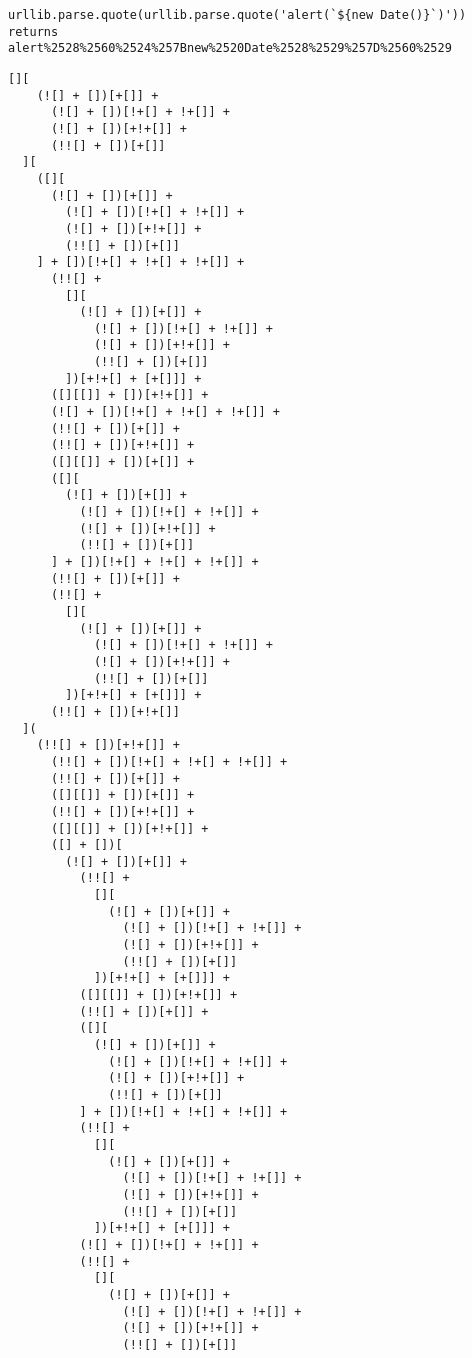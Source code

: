 \begin{lstlisting}[style=basicStyle, caption=url encoded example pass, label={lst:doublepercentencoding}]
urllib.parse.quote(urllib.parse.quote('alert(`${new Date()}`)'))
returns
alert%2528%2560%2524%257Bnew%2520Date%2528%2529%257D%2560%2529
\end{lstlisting}

\begin{lstlisting}[style=basicStyle, caption=alert('XSS') in JSFuck, label={lst:alertxssjsfuck}]
  [][
    (![] + [])[+[]] +
      (![] + [])[!+[] + !+[]] +
      (![] + [])[+!+[]] +
      (!![] + [])[+[]]
  ][
    ([][
      (![] + [])[+[]] +
        (![] + [])[!+[] + !+[]] +
        (![] + [])[+!+[]] +
        (!![] + [])[+[]]
    ] + [])[!+[] + !+[] + !+[]] +
      (!![] +
        [][
          (![] + [])[+[]] +
            (![] + [])[!+[] + !+[]] +
            (![] + [])[+!+[]] +
            (!![] + [])[+[]]
        ])[+!+[] + [+[]]] +
      ([][[]] + [])[+!+[]] +
      (![] + [])[!+[] + !+[] + !+[]] +
      (!![] + [])[+[]] +
      (!![] + [])[+!+[]] +
      ([][[]] + [])[+[]] +
      ([][
        (![] + [])[+[]] +
          (![] + [])[!+[] + !+[]] +
          (![] + [])[+!+[]] +
          (!![] + [])[+[]]
      ] + [])[!+[] + !+[] + !+[]] +
      (!![] + [])[+[]] +
      (!![] +
        [][
          (![] + [])[+[]] +
            (![] + [])[!+[] + !+[]] +
            (![] + [])[+!+[]] +
            (!![] + [])[+[]]
        ])[+!+[] + [+[]]] +
      (!![] + [])[+!+[]]
  ](
    (!![] + [])[+!+[]] +
      (!![] + [])[!+[] + !+[] + !+[]] +
      (!![] + [])[+[]] +
      ([][[]] + [])[+[]] +
      (!![] + [])[+!+[]] +
      ([][[]] + [])[+!+[]] +
      ([] + [])[
        (![] + [])[+[]] +
          (!![] +
            [][
              (![] + [])[+[]] +
                (![] + [])[!+[] + !+[]] +
                (![] + [])[+!+[]] +
                (!![] + [])[+[]]
            ])[+!+[] + [+[]]] +
          ([][[]] + [])[+!+[]] +
          (!![] + [])[+[]] +
          ([][
            (![] + [])[+[]] +
              (![] + [])[!+[] + !+[]] +
              (![] + [])[+!+[]] +
              (!![] + [])[+[]]
          ] + [])[!+[] + !+[] + !+[]] +
          (!![] +
            [][
              (![] + [])[+[]] +
                (![] + [])[!+[] + !+[]] +
                (![] + [])[+!+[]] +
                (!![] + [])[+[]]
            ])[+!+[] + [+[]]] +
          (![] + [])[!+[] + !+[]] +
          (!![] +
            [][
              (![] + [])[+[]] +
                (![] + [])[!+[] + !+[]] +
                (![] + [])[+!+[]] +
                (!![] + [])[+[]]

\end{lstlisting}
